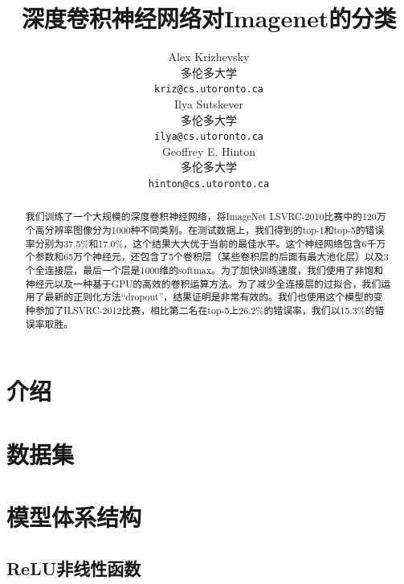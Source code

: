 \documentclass[12pt]{article}
\title{深度卷积神经网络对\textsf{Imagenet}的分类}
\author{
  Alex Krizhevsky \\
  多伦多大学\\
  \texttt{kriz@cs.utoronto.ca} \\
   \And
 Ilya Sutskever \\
  多伦多大学\\
  \texttt{ilya@cs.utoronto.ca} \\
  \And
 Geoffrey E. Hinton\\
  多伦多大学\\
  \texttt{hinton@cs.utoronto.ca}
}
\begin{document}
\begin{CJK*}{UTF8}{gkai}\CJKindent
\maketitle

\begin{abstract}

我们训练了一个大规模的深度卷积神经网络，将ImageNet LSVRC-2010比赛中的120万个高分辨率图像分为1000种不同类别。在测试数据上，我们得到的top-1和top-5的错误率分别为37.5\%和17.0\%，这个结果大大优于当前的最佳水平。这个神经网络包含6千万个参数和65万个神经元，还包含了5个卷积层（某些卷积层的后面有最大池化层）以及3个全连接层，最后一个层是1000维的softmax。为了加快训练速度，我们使用了非饱和神经元以及一种基于GPU的高效的卷积运算方法。为了减少全连接层的过拟合，我们运用了最新的正则化方法“dropout”，结果证明是非常有效的。我们也使用这个模型的变种参加了ILSVRC-2012比赛，相比第二名在top-5上26.2\%的错误率，我们以15.3\%的错误率取胜。
\end{abstract}




\section{介绍}



\section{数据集}



\section{模型体系结构}



\subsection{ReLU非线性函数}



\end{CJK*}
\end{document}
